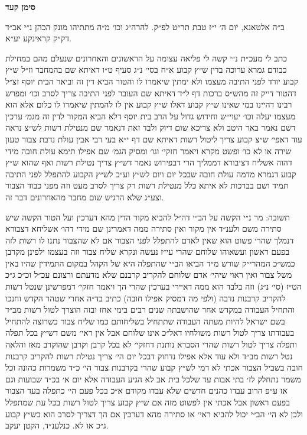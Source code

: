 \documentclass[12pt, openany]{book}
\newcommand{\chapname}{}
\newcommand{\newchap}[1]{
	\addcontentsline{toc}{chapter}{#1}
	\renewcommand{\chapname}{#1}
		\begin{center}
			\textbf{%
\fontsize{16pt}{16pt}\selectfont
				#1}
		\end{center}
}
\begin{document}
\newchap{סימן קעד}
\begin{multicols}{2}
ב״ה אלטאנא, יום ה׳ י״ז טבת תר״ט לפ״ק. להרה״ג וכו׳ מ״ה מתתיהו מונק הכהן נ״י אב״ד דק״ק קראינקע יע״א.\\\vspace{0pt}

כתב לי מעכ״ת נ״י קשה לי פליאה עצומה על הראשונים והאחרונים שנעלם מהם במחילת כבודם גמרא ערוכה בדין ש״ץ קבוע א״ח בסי׳ נ״ג סעיף ט״ו דאיתא שם בהמחבר וז״ל ש״ץ קבוע יורד לפני התיבה מעצמו ולא ימתין שיאמרו לו והטור הביא דין זה וביאר הבית יוסף זצ״ל דהטור דייק זה מהש״ס ברכות דף ל״ד דאיתא שם העובר לפני התיבה צריך לסרב וכו׳ ומפרש רבינו דהיינו במי שאינו ש״ץ קבוע דאלו ש״ץ קבוע אין לו להמתין שיאמרו לו כלום אלא הוא מעצמו יעלה וכו׳ יעוי״ש וחידוש גדול על הרב בית יוסף דלא הביא המקור לדין זה מגמ׳ ערכין דשם נאמר באר היטב ולא צריכא שום דיוק ולבד זאת דנאמר שם מנטילת רשות לש״צ נראה עוד דאפי׳ ש״צ קבוע צריך ליטול רשות דאיתא שם דף י״א בעי רבי אבין עולת נדבת צבור טעון שירה או לא כו׳ ופשט מקרא ויאמר חזקי׳ וגו׳ ומסיק הגמ׳ שם אפילו תימא עולת חובה מידי דהוה אשליח דציבורא דממליך הרי דבפירוש נאמר דש״ץ צריך נטילת רשות ואף שהוא ש״ץ קבוע דגמרא מדמה עולת חובה שבכל יום ויום לש״ץ וע״כ לש״ץ הקבוע להתפלל לפני התיבה תמיד ושם בברכות לא איתא כלל מנטילת רשות רק צריך לסרב מעט וזה מפני כבוד הצבור וצע״ג שלא הרגיש שום מחבר מהאחרונים דבר זה.\\\vspace{0pt}

תשובה: מר נ״י הקשה על הב״י דה״ל להביא מקור הדין מהא דערכין ועל הטור הקשה שיש סתירה משם ולענ״ד אין מקור ואין סתירה ממה דאמרינן שם מידי דהו׳ אשליחא דצבורא דנמלך שהרי פשוט הוא שאין לאדם להתפלל לפני הצבור אם לא שהצבור נתנו לו רשות לזה בפעם ראשון ועשאוהו שלוחם שהרי עי״ז נעשה ונקרא שליח צבור וזה בעצמו ילפינן מקרבן כמש״כ המהרי״ק שורש מ״ד הביאו הב״י שהתפלה היא של הקהל במקום התמידין שהיו באין משל צבור ואין ראוי שיהי׳ אדם שלוחם להקריב קרבנם שלא מדעתם ורצונם עכ״ל וכ״כ ג״כ הט״ז (סי׳ נ״ג) וזה בלבד הוא ממה דאיירי בערכין שהרי הך ויאמר חזקי׳ דמפרשינן שנטל רשות להקריב קרבנות נדבה (ולפי מה דמסיק אפילו חובה) כתיב בד״ה אחרי שטהר הקדש וחנכו והתחיל העבודה במקדש אחר שהושבתה שנים רבים בימי אחז ובזה הוצרך לטול רשות מב״ד בשם ישראל להיות מעתה העבודה שתתחיל בשליחותם כמו שליח צבור כשרוצה להתחיל בעבודתו צריך לטול רשות משולחיו דאל״כ אינו שלוחם אבל אין ראי׳ משם דש״ץ בכל תפלה ותפלה צריך לטול רשות שהרי הסברא נותנת דחזקי׳ לא בכל קרבן וקרבן שהוקרב מאז והלאה נטל רשות מב״ד ולא עוד אלא אפילו נדחוק דבכל יום הי׳ צריך נטילת רשות להקריב קרבנות חובה בשביל הצבור אכתי לא דמי לש״ץ קבוע שהרי בקרבנות צבור הי׳ כ״ד משמרות כהונה וכל משמר נתחלק לז׳ בתי אבות עד שלכל בית אב לא הגיע העבודה אלא יום א׳ בכ״ד שבועות וגם אז ע״פ הרוב עבדו כהנים חדשים שלא עבדו מקודם א״כ בכל פעם הי׳ כתפלה בעד הצבור בפעם ראשון אבל אכתי אין לפשוט מזה אם ש״ץ קבוע צריך לטול רשות בכל עת שמתפלל ולכן לא הי׳ הב״י יכול להביא ראי׳ או סתירה מהא דערכין אם הך דצריך לסרב הוא בש״ץ קבוע ג״כ או לא. כנלענ״ד, הקטן יעקב.\\\vspace{0pt}

\end{multicols}\newpage
\end{document}
